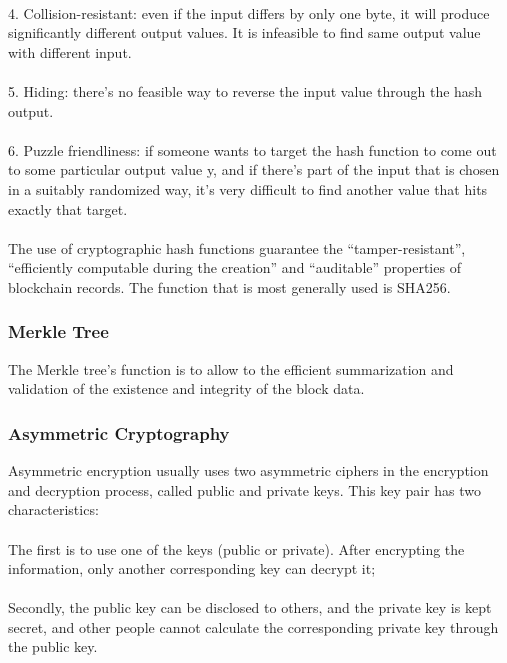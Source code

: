 \documentclass[]{article}
\begin{document}
\begin{CJK*}{UTF8}{gbsn}
\paragraph{}  4. Collision-resistant: even if the input differs by only one byte, it will produce significantly different output values. It is infeasible to find same output value with different input.
\paragraph{} 5. Hiding: there's no  feasible way to reverse the input value through the hash output.
\paragraph{} 6. Puzzle friendliness: if someone wants to target the hash function to come out to some
particular output value y, and if there’s part of the input that is chosen in a suitably randomized way,
it’s very difficult to find another value that hits exactly that target.
\paragraph{} The use of cryptographic hash functions guarantee the ``tamper-resistant'', ``efficiently computable during the creation'' and ``auditable'' properties of blockchain records. The function that is most generally used is SHA256.
\subsubsection*{Merkle Tree}
The Merkle tree's function is to allow to the efficient summarization and validation of the existence and integrity of the block data.
\subsubsection*{Asymmetric Cryptography}
Asymmetric encryption usually uses two asymmetric ciphers in the encryption and decryption process, called public and private keys. This key pair has two characteristics: \paragraph{} The first is to use one of the keys (public or private). After encrypting the information, only another corresponding key can decrypt it; 
\paragraph{} Secondly, the public key can be disclosed to others, and the private key is kept secret, and other people cannot calculate the corresponding private key through the public key. 

\end{CJK*}
\end{document}

